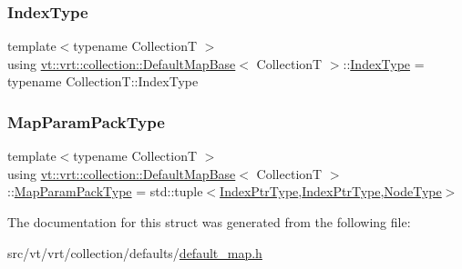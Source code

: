 \subsubsection{\texorpdfstring{Index\+Type}{IndexType}}
{\footnotesize\ttfamily template$<$typename CollectionT $>$ \\
using \hyperlink{structvt_1_1vrt_1_1collection_1_1_default_map_base}{vt\+::vrt\+::collection\+::\+Default\+Map\+Base}$<$ CollectionT $>$\+::\hyperlink{structvt_1_1vrt_1_1collection_1_1_default_map_base_a88a872640fd6de6c456cb6eb9512665b}{Index\+Type} =  typename Collection\+T\+::\+Index\+Type}

\mbox{\label{structvt_1_1vrt_1_1collection_1_1_default_map_base_a94765cd0fe916d073a01eba6eb796f8e}} 
\subsubsection{\texorpdfstring{Map\+Param\+Pack\+Type}{MapParamPackType}}
{\footnotesize\ttfamily template$<$typename CollectionT $>$ \\
using \hyperlink{structvt_1_1vrt_1_1collection_1_1_default_map_base}{vt\+::vrt\+::collection\+::\+Default\+Map\+Base}$<$ CollectionT $>$\+::\hyperlink{structvt_1_1vrt_1_1collection_1_1_default_map_base_a94765cd0fe916d073a01eba6eb796f8e}{Map\+Param\+Pack\+Type} =  std\+::tuple$<$\hyperlink{structvt_1_1vrt_1_1collection_1_1_default_map_base_a0a2460c532fc180c1aeb8b3b5d0df59e}{Index\+Ptr\+Type},\hyperlink{structvt_1_1vrt_1_1collection_1_1_default_map_base_a0a2460c532fc180c1aeb8b3b5d0df59e}{Index\+Ptr\+Type},\hyperlink{namespacevt_a866da9d0efc19c0a1ce79e9e492f47e2}{Node\+Type}$>$}



The documentation for this struct was generated from the following file\+:\begin{DoxyCompactItemize}
\item 
src/vt/vrt/collection/defaults/\hyperlink{default__map_8h}{default\+\_\+map.\+h}\end{DoxyCompactItemize}
